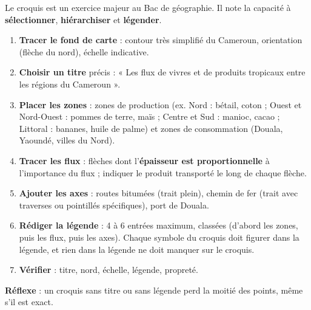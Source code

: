 \documentclass[11pt]{article}
\begin{document}
\begin{methode}
Le croquis est un exercice majeur au Bac de géographie. Il note la capacité à \textbf{sélectionner}, \textbf{hiérarchiser} et \textbf{légender}.
\begin{enumerate}
\item \textbf{Tracer le fond de carte} : contour très simplifié du Cameroun, orientation (flèche du nord), échelle indicative.
\item \textbf{Choisir un titre} précis : « Les flux de vivres et de produits tropicaux entre les régions du Cameroun ».
\item \textbf{Placer les zones} : zones de production (ex. Nord : bétail, coton ; Ouest et Nord-Ouest : pommes de terre, maïs ; Centre et Sud : manioc, cacao ; Littoral : bananes, huile de palme) et zones de consommation (Douala, Yaoundé, villes du Nord).
\item \textbf{Tracer les flux} : flèches dont l'\textbf{épaisseur est proportionnelle} à l'importance du flux ; indiquer le produit transporté le long de chaque flèche.
\item \textbf{Ajouter les axes} : routes bitumées (trait plein), chemin de fer (trait avec traverses ou pointillés spécifiques), port de Douala.
\item \textbf{Rédiger la légende} : 4 à 6 entrées maximum, classées (d'abord les zones, puis les flux, puis les axes). Chaque symbole du croquis doit figurer dans la légende, et rien dans la légende ne doit manquer sur le croquis.
\item \textbf{Vérifier} : titre, nord, échelle, légende, propreté.
\end{enumerate}
\textbf{Réflexe} : un croquis sans titre ou sans légende perd la moitié des points, même s'il est exact.
\end{methode}
\end{document}
